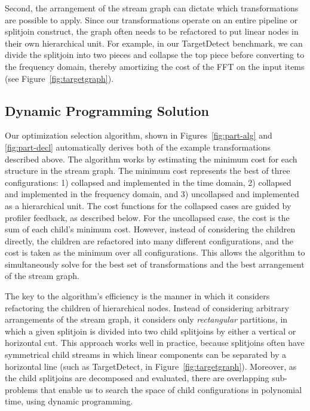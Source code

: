 Second, the arrangement of the stream graph can dictate which
transformations are possible to apply.  Since our transformations
operate on an entire pipeline or splitjoin construct, the
graph often needs to be refactored to put linear nodes in their own
hierarchical unit.  For example, in our TargetDetect benchmark, we can
divide the splitjoin into two pieces and collapse the top piece
before converting to the frequency domain, thereby amortizing the cost
of the FFT on the input items (see Figure~\ref{fig:targetgraph}).

\subsection{Dynamic Programming Solution}

Our optimization selection algorithm, shown in Figures~\ref{fig:part-alg} 
and \ref{fig:part-decl}
automatically derives both of the example transformations described above.  
The algorithm works by estimating the minimum cost for each structure 
in the stream graph. The minimum cost represents the best
of three configurations: 1) collapsed and implemented in the time
domain, 2) collapsed and implemented in the frequency domain, and 3)
uncollapsed and implemented as a hierarchical unit.  The cost
functions for the collapsed cases are guided by profiler feedback, as
described below.  For the uncollapsed case, the cost is the sum of
each child's minimum cost.  However, instead of considering the
children directly, the children are refactored into many different
configurations, and the cost is taken as the minimum over all
configurations.  This allows the algorithm to simultaneously solve for
the best set of transformations and the best arrangement of the stream
graph.

The key to the algorithm's efficiency is the manner in which it
considers refactoring the children of hierarchical nodes.  Instead of
considering arbitrary arrangements of the stream graph, it considers
only {\it rectangular} partitions, in which a given splitjoin is
divided into two child splitjoins by either a vertical or horizontal
cut.  This approach works well in practice, because splitjoins
often have symmetrical child streams in which linear components can be
separated by a horizontal line (such as TargetDetect, in
Figure~\ref{fig:targetgraph}).  Moreover, as the child splitjoins are
decomposed and evaluated, there are overlapping sub-problems that
enable us to search the space of child configurations in polynomial
time, using dynamic programming.

